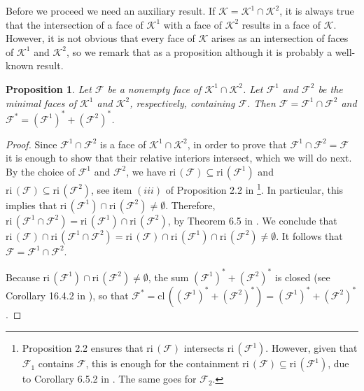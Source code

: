 \documentclass{article}
\newcommand{\reInt}{\mathrm{ri}\,}
\newcommand{\closure}{\mathrm{cl}\,}
\newcommand{\stdCone}{ {\mathcal{K}}}
\newcommand{\stdFace}{ \mathcal{F}}
\newtheorem{lemma}[definition]{Lemma}
\newtheorem{proposition}[definition]{Proposition}
\begin{document}
Before we proceed we need an auxiliary result. If $\stdCone  = \stdCone^1 \cap \stdCone^2$, 
it is always true that the intersection of a face of $\stdCone^1$ with a 
face of $\stdCone^2$ results in a face of $\stdCone$.
However, it is not  obvious  that every face of $\stdCone$ arises 
as an intersection of faces of $\stdCone ^1$ and $\stdCone ^2$, so we remark 
that as a proposition although it is probably a well-known result.

\begin{proposition}\label{prop:intersection}
Let $\stdFace$ be a nonempty face of $\stdCone ^1 \cap \stdCone ^2$.
Let $\stdFace^1$ and $\stdFace^2$ be the minimal faces of $\stdCone^1$ and $\stdCone^2$, respectively, containing 
$\stdFace$. 
Then $\stdFace = \stdFace^1\cap \stdFace^2$ and $\stdFace^* =  (\stdFace^1)^* + (\stdFace^2)^*$.
\end{proposition}
\begin{proof}
Since $\stdFace ^1 \cap \stdFace ^2$ is a face of $\stdCone^1 \cap \stdCone ^2$,
in order to prove that $\stdFace ^1 \cap \stdFace ^2 = \stdFace$ it is 
enough to show that their relative interiors intersect, which we will do next. By the choice of $\stdFace^1$ and $\stdFace^2$, 
we have $\reInt(\stdFace) \subseteq \reInt (\stdFace^1)$ and 
$\reInt(\stdFace) \subseteq \reInt (\stdFace^2)$, see item $(iii)$ of Proposition 2.2 in \cite{pataki_handbook}\footnote{Proposition 2.2 ensures that $\reInt(\stdFace) $ intersects 
$\reInt (\stdFace^1)$. However, given that $\stdFace _1$ contains $\stdFace$, this is enough for 
the containment $\reInt(\stdFace) \subseteq \reInt (\stdFace^1)$, due to Corollary 6.5.2 in \cite{rockafellar}. The same goes for $\stdFace _2$. }. In particular, 
this implies that $\reInt (\stdFace^1) \cap \reInt (\stdFace^2) \neq \emptyset$.
Therefore, $\reInt (\stdFace^1 \cap  \stdFace^2)  = \reInt (\stdFace^1) \cap \reInt (\stdFace^2) $,
by Theorem 6.5 in \cite{rockafellar}. We conclude that  
$\reInt(\stdFace) \cap \reInt (\stdFace^1 \cap  \stdFace^2) = \reInt(\stdFace) \cap \reInt (\stdFace^1) \cap \reInt (\stdFace^2) \neq \emptyset$. It follows 
that $\stdFace = \stdFace^1 \cap  \stdFace^2$.

Because $\reInt (\stdFace^1) \cap \reInt (\stdFace^2) \neq \emptyset$, the sum $(\stdFace^1)^* + (\stdFace^2)^*$ is closed (see Corollary 16.4.2 in \cite{rockafellar}), so 
that $\stdFace^* = \closure ((\stdFace^1)^* + (\stdFace^2)^*) = (\stdFace^1)^* + (\stdFace^2)^*$.
\end{proof}
%
\end{document}
